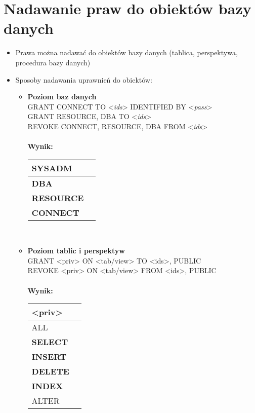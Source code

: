 \documentclass[a4paper,twoside]{article}
\begin{document}
  	\section*{Nadawanie praw do obiektów bazy danych}
  	\begin{itemize}
  		\item Prawa można nadawać do obiektów bazy danych (tablica, perspektywa, procedura bazy danych)
  		\item Sposoby nadawania uprawnień do obiektów:
  		\begin{itemize}
  			\item \textbf{Poziom baz danych}\\
  			GRANT CONNECT TO <\emph{ids}> IDENTIFIED BY <\emph{pass}>\\
  			GRANT {RESOURCE, DBA} TO <\emph{ids}>\\
  			REVOKE {CONNECT, 
  				RESOURCE, DBA} FROM  <\emph{ids}>\\\\
  			\textbf{Wynik:}\\
  			\begin{tabular}{|l|l|}
  				\hline
  				SYSADM\\
  				\hline
  				\textbf{DBA}\\
  				\hline
  				\textbf{RESOURCE}\\
  				\hline
  				\textbf{CONNECT}\\
  				\hline
  			\end{tabular}\\
  			\item \textbf{Poziom tablic i perspektyw}\\
  			GRANT  <priv> ON <tab/view> TO {<ids>, PUBLIC}\\
  			REVOKE <priv> ON <tab/view> FROM {<ids>, PUBLIC}\\\\
  			\textbf{Wynik:}\\
  			\begin{tabular}{|l|l|}
  				\hline \textbf{<priv>}\\
  				\hline ALL\\
  				\hline \textbf{SELECT}\\
  				\hline \textbf{INSERT}\\
  				\hline \textbf{DELETE}\\
  				\hline \textbf{INDEX}\\
  				\hline ALTER\\

\end{tabular}
\end{itemize}
\end{itemize}
\end{document}
